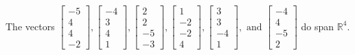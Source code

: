 \begin{exercise}
\begin{exerciseStatement}
  \end{exerciseStatement}
  \begin{exerciseAnswer}
   The vectors \(\left[\begin{array}{r}
-5 \\
4 \\
4 \\
-2
\end{array}\right] , \left[\begin{array}{r}
-4 \\
3 \\
4 \\
1
\end{array}\right] , \left[\begin{array}{r}
2 \\
2 \\
-5 \\
-3
\end{array}\right] , \left[\begin{array}{r}
1 \\
-2 \\
-2 \\
4
\end{array}\right] , \left[\begin{array}{r}
3 \\
3 \\
-4 \\
1
\end{array}\right] , \text{ and } \left[\begin{array}{r}
-4 \\
4 \\
-5 \\
2
\end{array}\right]\) 
  	 do  
	span \(\mathbb{R}^4\).
  


  \end{exerciseAnswer}
\end{exercise}